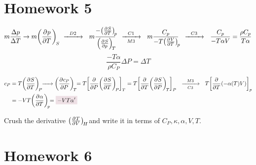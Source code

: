 \documentclass{article}
\begin{document}
\section{Homework 5}
\begin{problem}[Reif 5.12]
    \answerline
    \begin{equation*}
        m\frac{\Delta p}{\Delta T}
        \rightarrow
        m\pder{p}{T}[S] 
        \CrushStep{D2} 
        m\DerivCrush*{p}{T}{S}
        \CrushStep{C1}[M3]
        m\frac{C_p}{-T\pder{V}{T}[p]}
        \CrushStep{C3}
        \frac{C_p}{-T\alpha V}=\frac{\rho C_p}{T\alpha}
    \end{equation*}
    \vspace{0.5cm}
    \begin{equation*}
        \frac{-T\alpha}{\rho C_P}\Delta P=\Delta T
    \end{equation*}
\end{problem}
\begin{problem}[Reif 5.13]
    \answerline
    \begin{align*}
        c_P&=T\pder{S}{T}[P]\xrightarrow{~~~~} \pder{c_P}{P}[T]=T\qty[\pder{P}\pder{S}{T}[P]~]_T=T\qty[\pder{T}\pder{S}{P}[T]~]_P\CrushStep{M3}[C3]T\qty[\pder{T}\qty(-\alpha(T) V)]_p
        \\
        &=-VT\pder{\alpha}{T}[p]=\coloredanswer{-VT\alpha'}
    \end{align*}
\end{problem}
\begin{problem}[Reif 5.14]
    
\end{problem}
\begin{problem}[Crushing (T/V)H]
    Crush the derivative $\pder{T}{V}[H]$ and write it in terms of $C_P,\kappa,\alpha,V,T$. 
\end{problem}
\section{Homework 6}
\begin{problem}[Reif 5.15]
    
\end{problem}
\begin{problem}[Reif 5.17]
    
\end{problem}
\begin{problem}[Reif 5.23]
    
\end{problem}
\end{document}
